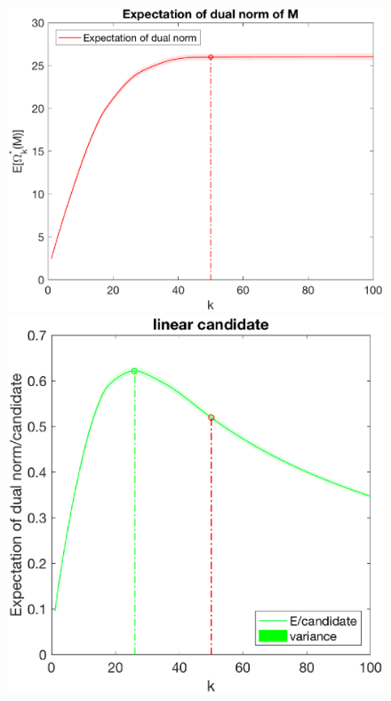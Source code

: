 \documentclass[12pt]{article}
\begin{document}
\begin{figure}[h]
    \begin{minipage}[c]{.3\linewidth}
        \centering
        \includegraphics[width=\linewidth]{Fig/dualnorm-u0rand-k0-50.eps}
    \end{minipage}
    \hfill%
    \begin{minipage}[c]{.3\linewidth}
        \centering
        \includegraphics[width=\linewidth]{Fig/dualnorm-u0rand-k0-50-candidatelin.eps}

\end{minipage}
\end{figure}
\end{document}
